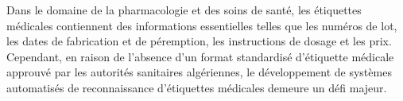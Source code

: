 \begin{comment}
    
Dans le domaine de la pharmacologie, les étiquettes des médicaments ou oussi appellées vignettes jouent un rôle essentiel en fournissant des informations importantes sur les médicaments qui sont vendus ou distribués, notamment des détails tels que les numéros de lot, les dates de fabrication et d'expiration, ainsi que d'autres informations pertinentes sur les médicaments. Cependant, l'absence d'un modèle normalisé pour les étiquettes médicales approuvé par le Ministère de la Santé a conduit à l'absence de systèmes de reconnaissance automatique des étiquettes médicales en Algérie. Dans ce travaille nous proposons un système basé sur l'intelligence artificielle capable d'identifier automatiquement les étiquettes médicales, d'extraire leur contenu et de les classifier comme médicaments remboursables ou non remboursables.

Cette étude présente deux approches : l'approche basée sur Tesseract et l'approche basée sur VisionAI. L'approche basée sur Tesseract utilise des techniques traditionnelles de détection et de segmentation à l'aide de méthodes classiques de traitement d'images, telles que l'analyse des histogrammes horizontaux et verticaux, pour identifier et segmenter les lignes et les sections des étiquettes médicales. De plus, PyTesseract, un outil de reconnaissance optique de caractères (OCR), est utilisé pour extraire le texte des étiquettes médicales. D'autre part, l'approche basée sur VisionAI intègre un modèle de détection et segmentation personnalisé pour les étiquettes médicales, qui présente des résultats précis et fiables. De plus, cette approche utilise VisionAI, un moteur OCR très précis, pour l'extraction du texte des étiquettes médicales.

Les évaluations expérimentales démontrent les performances supérieures de l'approche basée sur VisionAI, atteignant une précision remarquable d'environ 95,79\% dans la détection des étiquettes médicales et l'extraction de leur contenu. Cette recherche présente une solution prometteuse au manque de systèmes de reconnaissance automatique des étiquettes médicales en Algérie, fournissant ainsi une base pour la mise en œuvre d'outils efficaces et fiables de gestion et de classification des médicaments. Des recherches supplémentaires sont nécessaires pour améliorer les capacités du système et élargir son applicabilité dans le domaine de la santé.
\end{comment}
Dans le domaine de la pharmacologie et des soins de santé, les étiquettes médicales contiennent des informations essentielles telles que les numéros de lot, les dates de fabrication et de péremption, les instructions de dosage et les prix. Cependant, en raison de l’absence d’un format standardisé d’étiquette médicale approuvé par les autorités sanitaires algériennes, le développement de systèmes automatisés de reconnaissance d’étiquettes médicales demeure un défi majeur.

